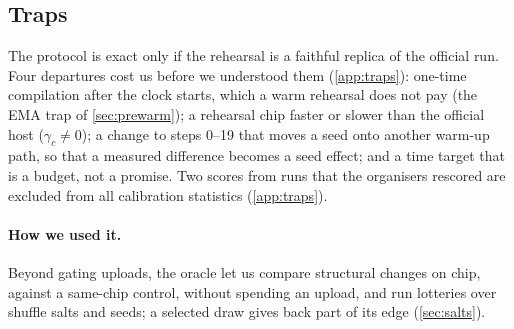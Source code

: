 \subsection{Traps}
\label{sec:traps}

The protocol is exact only if the rehearsal is a faithful replica of the official run. Four departures cost us
before we understood them (\cref{app:traps}): one-time compilation after the clock starts, which a warm rehearsal
does not pay (the EMA trap of \cref{sec:prewarm}); a rehearsal chip faster or slower than the official host
($\gamma_c\neq0$); a change to steps 0--19 that moves a seed onto another warm-up path, so that a measured difference
becomes a seed effect; and a time target that is a budget, not a promise. Two scores from runs that the organisers
rescored are excluded from all calibration statistics (\cref{app:traps}).

\paragraph{How we used it.} Beyond gating uploads, the oracle let us compare structural changes on chip, against a
same-chip control, without spending an upload, and run lotteries over shuffle salts and seeds; a selected draw gives
back part of its edge (\cref{sec:salts}).
